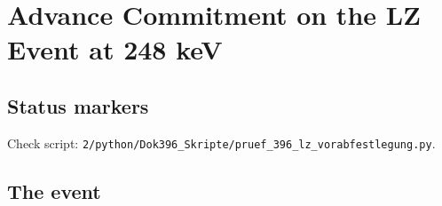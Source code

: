 
\providecommand{\BM}{\textbf{[B]}}
\providecommand{\KM}{\textbf{[K]}}
\providecommand{\SM}{\textbf{[S]}}
\providecommand{\XM}{\textbf{[X]}}
\providecommand{\QM}{\textbf{[Q]}}

\chapter*{Advance Commitment on the LZ Event at 248 keV}

\begin{abstract}
In September 2026 the xenon detector LZ published a single event that, by every criterion checked,
looks like a heavy particle striking a xenon nucleus, with a recoil energy of about 248\,keV, against
an expected background of about one hundredth of an event. The global significance is
2.6\,$\sigma$; according to the collaboration the analysis is not blind. In FFGFT, dark matter is not
a substance but the regime below the acceleration scale $a_0$ in which inertia is nonlinear
(Doc.~308). A direct detection of a dark matter particle is therefore a falsification criterion for
this reading. Before further data are analysed, this document states what FFGFT expects for LZ and
what would refute it: no accumulation of such events and no annual modulation peaking in early
June. A confirmed excess with this modulation would refute the reading. The way out, that such a
particle could exist without carrying the rotation curves, is explicitly not claimed.
\end{abstract}

\section*{Status markers}

Check script: \texttt{2/python/Dok396\_Skripte/pruef\_396\_lz\_vorabfestlegung.py}.

\section{The event}

